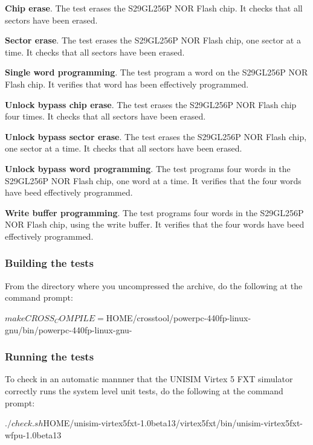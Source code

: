 \noindent \textbf{Chip erase}. The test erases the S29GL256P NOR Flash chip.
It checks that all sectors have been erased.

\noindent \textbf{Sector erase}. The test erases the S29GL256P NOR Flash chip, one sector at a time.
It checks that all sectors have been erased.

\noindent \textbf{Single word programming}. The test program a word on the S29GL256P NOR Flash chip.
It verifies that word has been effectively programmed.

\noindent \textbf{Unlock bypass chip erase}. The test erases the S29GL256P NOR Flash chip four times.
It checks that all sectors have been erased.

\noindent \textbf{Unlock bypass sector erase}. The test erases the S29GL256P NOR Flash chip, one sector at a time.
It checks that all sectors have been erased.

\noindent \textbf{Unlock bypass word programming}. The test programs four words in the S29GL256P NOR Flash chip, one word at a time.
It verifies that the four words have beed effectively programmed.

\noindent \textbf{Write buffer programming}. The test programs four words in the S29GL256P NOR Flash chip, using the write buffer.
It verifies that the four words have beed effectively programmed.

\subsubsection{Building the tests}

From the directory where you uncompressed the archive, do the following at the command prompt:
\begin{script}
   $ make CROSS_COMPILE=${HOME}/crosstool/powerpc-440fp-linux-gnu/bin/powerpc-440fp-linux-gnu-
\end{script}

\subsubsection{Running the tests}

\noindent To check in an automatic mannner that the UNISIM Virtex 5 FXT simulator correctly runs the system level unit tests, do the following at the command prompt:
\begin{script}
   $ ./check.sh ${HOME}/unisim-virtex5fxt-1.0beta13/virtex5fxt/bin/unisim-virtex5fxt-wfpu-1.0beta13
\end{script}

